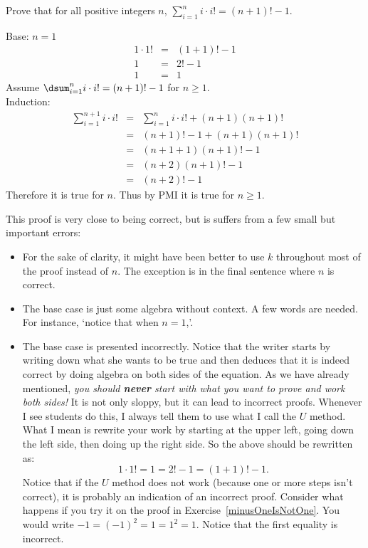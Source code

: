 \begin{eval}
Prove that for all positive integers $n$,
${\displaystyle \sum_{i=1}^{n} i\cdot i! = (n+1)!-1}$.
\begin{ssol}
Base: $n=1$
\begin{eqnarray*}
1\cdot 1!&=&(1+1)!-1\\
1&=&2!-1\\
1&=&1
\end{eqnarray*}
Assume $\dsum_{i=1}^n i\cdot i! = (n+1)!-1$ for $n\geq 1$.\\
Induction:
\begin{eqnarray*}
\sum_{i=1}^{n+1}i\cdot i! &=& \sum_{i=1}^{n}i\cdot i! + (n+1)(n+1)!\\
&=& (n+1)! - 1 + (n+1)(n+1)!\\
&=&  (n+1+1)(n+1)! -1\\
&=&  (n+2)(n+1)! -1\\
&=&  (n+2)! -1
\end{eqnarray*}
Therefore it is true for $n$.  Thus by PMI it is true for $n\geq 1$.
\end{ssol}
\evallinethree
\begin{answer}
This proof is very close to being correct, but is suffers from a few small but important errors:
\begin{itemize}
\item
For the sake of clarity, it might have been better to use $k$ throughout most of the proof
instead of $n$.  The exception is in the final sentence where $n$ is correct.
\item
The base case is just some algebra without context.  A few words are needed.  For instance, 
`notice that when $n=1$,'.
\item
The base case is presented incorrectly.  Notice that the writer starts by writing down what
she wants to be true and then deduces that it is indeed correct by doing algebra on both sides
of the equation.  As we have already mentioned, 
{\em you should {\bf never} start with what you want to prove and work both sides!}
It is not only sloppy, but it can lead to incorrect proofs.
Whenever I see students do this, I always tell them to use what I call the $U$ method.  What I mean
is rewrite your work by starting at the upper left, going down the left side, then doing up the
right side.  So the above should be rewritten as:
$$1\cdot 1! = 1 = 2!-1 = (1+1)!-1.$$
Notice that if the $U$ method does not work (because one
or more steps isn't correct), it is probably an indication
of an incorrect proof.  Consider what happens if you try it
on the proof in Exercise~\ref{minusOneIsNotOne}.  You would
write $-1=(-1)^2=1=1^2=1$.  Notice that the first equality
is incorrect.


\end{itemize}
\end{answer}
\end{eval}

